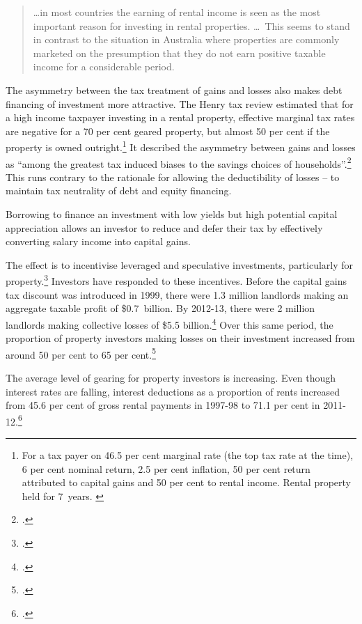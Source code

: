 \documentclass{grattan}\usepackage[]{graphicx}\usepackage[]{color}
\begin{document}
\begin{quote}
\dots in most countries the earning of rental income is seen as the most important reason for investing in rental properties. \dots\ This seems to stand in contrast to the situation in Australia where properties are commonly marketed on the presumption that they do not earn positive taxable income for a considerable period.
\end{quote}

The asymmetry between the tax treatment of gains and losses also makes debt financing of investment more attractive. The Henry tax review estimated that for a high income taxpayer investing in a rental property, effective marginal tax rates are negative for a 70 per cent geared property, but almost 50 per cent if the property is owned outright.\footnote{For a tax payer on 46.5 per cent marginal rate (the top tax rate at the time), 6 per cent nominal return, 2.5 per cent inflation, 50 per cent return attributed to capital gains and 50 per cent to rental income. Rental property held for 7~years. \textcite[p.~74]{Treasury2010}}  It described the asymmetry between gains and losses as ``among the greatest tax induced biases to the savings choices of households''.\footcite[p.~69]{Treasury2010}  This runs contrary to the rationale for allowing the deductibility of losses -- to maintain tax neutrality of debt and equity financing. 

Borrowing to finance an investment with low yields but high potential capital appreciation allows an investor to reduce and defer their tax by effectively converting salary income into capital gains. 

The effect is to incentivise leveraged and speculative investments, particularly for property.\footcite[p.~17]{Inquiry2014} Investors have responded to these incentives. Before the capital gains tax discount was introduced in 1999, there were 1.3 million landlords making an aggregate taxable profit of \$0.7~billion. By 2012-13, there were 2 million landlords making collective losses of \$5.5 billion.\footcites{Eslake2013}{ATO2015} Over this same period, the proportion of property investors making losses on their investment increased from around 50 per cent to 65 per cent.\footcite{ATO2014e} 

The average level of gearing for property investors is increasing. Even though interest rates are falling, interest deductions as a proportion of rents increased from 45.6 per cent of gross rental payments in 1997-98 to 71.1 per cent in 2011-12.\footcite[p.~65]{Treasury2015}
\end{document}
